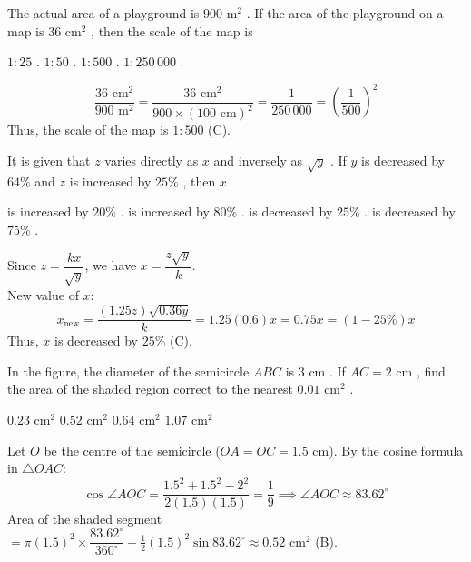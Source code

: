 \question The actual area of a playground is $900\text{ m}^2$ . If the area of the playground on a map is $36\text{ cm}^2$ , then the scale of the map is
\begin{choices}
    \choice $1 : 25$ .
    \choice $1 : 50$ .
    \correctchoice $1 : 500$ .
    \choice $1 : 250\,000$ .
\end{choices}
\begin{solution}
\[ \frac{36\text{ cm}^2}{900\text{ m}^2} = \frac{36\text{ cm}^2}{900 \times (100\text{ cm})^2} = \frac{1}{250\,000} = \left(\frac{1}{500}\right)^2 \]
Thus, the scale of the map is $1 : 500$ (C).
\end{solution}

\question It is given that $z$ varies directly as $x$ and inversely as $\sqrt{y}$ . If $y$ is decreased by $64\%$ and $z$ is increased by $25\%$ , then $x$
\begin{choices}
    \choice is increased by $20\%$ .
    \choice is increased by $80\%$ .
    \correctchoice is decreased by $25\%$ .
    \choice is decreased by $75\%$ .
\end{choices}
\begin{solution}
Since $z = \dfrac{kx}{\sqrt{y}}$, we have $x = \dfrac{z\sqrt{y}}{k}$. \\
New value of $x$:
\[ x_{\text{new}} = \frac{(1.25z)\sqrt{0.36y}}{k} = 1.25(0.6)x = 0.75x = (1 - 25\%)x \]
Thus, $x$ is decreased by $25\%$ (C).
\end{solution}

\question In the figure, the diameter of the semicircle $ABC$ is $3\text{ cm}$ . If $AC = 2\text{ cm}$ , find the area of the shaded region correct to the nearest $0.01\text{ cm}^2$ .

\begin{minipage}{0.45\textwidth}
\begin{choices}
    \choice $0.23\text{ cm}^2$
    \correctchoice $0.52\text{ cm}^2$
    \choice $0.64\text{ cm}^2$
    \choice $1.07\text{ cm}^2$
\end{choices}
\end{minipage}
\begin{minipage}{0.52\textwidth}
\centering
{}
\end{minipage}
\begin{solution}
Let $O$ be the centre of the semicircle ($OA = OC = 1.5\text{ cm}$). By the cosine formula in $\triangle OAC$:
\[ \cos\angle AOC = \frac{1.5^2 + 1.5^2 - 2^2}{2(1.5)(1.5)} = \frac{1}{9} \implies \angle AOC \approx 83.62^\circ \]
Area of the shaded segment $= \pi(1.5)^2 \times \dfrac{83.62^\circ}{360^\circ} - \frac{1}{2}(1.5)^2\sin 83.62^\circ \approx 0.52\text{ cm}^2$ (B).
\end{solution}

